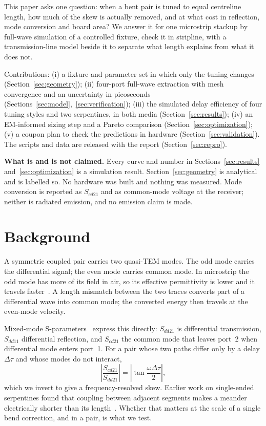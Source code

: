 \documentclass[10pt,twocolumn]{article}
\newcommand{\Sdd}[1]{S_{dd#1}}
\newcommand{\Scd}[1]{S_{cd#1}}
\begin{document}
This paper asks one question: when a bent pair is tuned to equal centreline length, how much of the skew is
actually removed, and at what cost in reflection, mode conversion and board area? We answer it for one microstrip stackup by
full-wave simulation of a controlled fixture, check it in stripline, with a transmission-line model beside it to separate what length
explains from what it does not.

Contributions: (i) a fixture and parameter set in which only the tuning changes (Section~\ref{sec:geometry});
(ii) four-port full-wave extraction with mesh convergence and an uncertainty in picoseconds
(Sections~\ref{sec:model},~\ref{sec:verification}); (iii) the simulated delay efficiency of four tuning styles and
two serpentines, in both media (Section~\ref{sec:results}); (iv) an EM-informed sizing step and a Pareto comparison
(Section~\ref{sec:optimization}); (v) a coupon plan to check the predictions in hardware
(Section~\ref{sec:validation}). The scripts and data are released with the report (Section~\ref{sec:repro}).

\textbf{What is and is not claimed.} Every curve and number in Sections~\ref{sec:results}
and~\ref{sec:optimization} is a simulation result. Section~\ref{sec:geometry} is analytical and is labelled so.
No hardware was built and nothing was measured. Mode conversion is reported as $\Scd{21}$ and as common-mode
voltage at the receiver; neither is radiated emission, and no emission claim is made.

\section{Background}

A symmetric coupled pair carries two quasi-TEM modes. The odd mode carries the differential signal; the even mode
carries common mode. In microstrip the odd mode has more of its field in air, so its effective permittivity is
lower and it travels faster~\cite{paul_mtl}. A length mismatch between the two traces converts part of a
differential wave into common mode; the converted energy then travels at the even-mode velocity.

Mixed-mode S-parameters~\cite{bockelman1995,ferrero2006} express this directly: $\Sdd{21}$ is differential
transmission, $\Sdd{11}$ differential reflection, and $\Scd{21}$ the common mode that leaves port~2 when
differential mode enters port~1. For a pair whose two paths differ only by a delay $\Delta\tau$ and whose modes do
not interact,
\begin{equation}
  \left|\frac{\Scd{21}}{\Sdd{21}}\right| = \left|\tan\frac{\omega\Delta\tau}{2}\right|,
  \label{eq:fdskew}
\end{equation}
which we invert to give a frequency-resolved skew. Earlier work on single-ended serpentines found that coupling
between adjacent segments makes a meander electrically shorter than its length~\cite{wu1995,rubin2000}. Whether
that matters at the scale of a single bend correction, and in a pair, is what we test.
\end{document}
